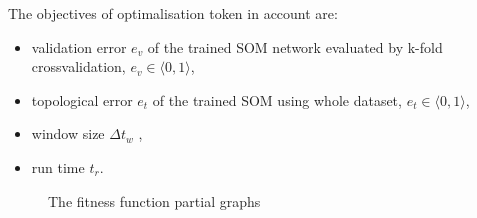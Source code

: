 \documentclass[a4paper]{IEEEtran}
\begin{document}
The objectives of optimalisation token in account are:
\begin{itemize}
	\item validation error $ e_v $ of the trained SOM network evaluated by k-fold
	crossvalidation, $ e_v \in \langle 0, 1 \rangle $,
	\item topological error  $ e_t $ of the trained SOM using whole dataset,
	$ e_t \in \langle 0, 1 \rangle $,
	\item window size $ \Delta t_w $ ,
	\item run time $ t_r $.
\end{itemize}
\begin{figure}[!h] %
  \centering
  \caption{The fitness function partial graphs}
  \label{fig:fit}
\end{figure}
\end{document}
